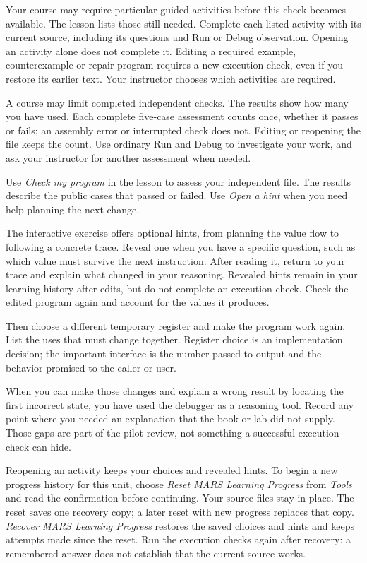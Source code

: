 Your course may require particular guided activities before this check becomes
available. The lesson lists those still needed. Complete each listed activity
with its current source, including its questions and Run or Debug observation.
Opening an activity alone does not complete it. Editing a required example,
counterexample or repair program requires a new execution check, even if you
restore its earlier text. Your instructor chooses which activities are required.

A course may limit completed independent checks. The results show how many you
have used. Each complete five-case assessment counts once, whether it passes or
fails; an assembly error or interrupted check does not. Editing or reopening the
file keeps the count. Use ordinary Run and Debug to investigate your work, and ask
your instructor for another assessment when needed.

Use \emph{Check my program} in the lesson to assess your independent file. The
results describe the public cases that passed or failed. Use \emph{Open a hint}
when you need help planning the next change.

The interactive exercise offers optional hints, from planning the value flow to
following a concrete trace. Reveal one when you have a specific question, such as
which value must survive the next instruction. After reading it, return to your
trace and explain what changed in your reasoning. Revealed hints remain in your
learning history after edits, but do not complete an execution check. Check the
edited program again and account for the values it produces.

Then choose a different temporary register and make the program work again. List
the uses that must change together. Register choice is an implementation decision;
the important interface is the number passed to output and the behavior promised
to the caller or user.

When you can make those changes and explain a wrong result by locating the first
incorrect state, you have used the debugger as a reasoning tool. Record any point
where you needed an explanation that the book or lab did not supply. Those gaps
are part of the pilot review, not something a successful execution check can hide.

Reopening an activity keeps your choices and revealed hints. To begin a new
progress history for this unit, choose \emph{Reset MARS Learning Progress} from
\emph{Tools} and read the confirmation before continuing. Your source files stay
in place. The reset saves one recovery copy; a later reset with new progress
replaces that copy. \emph{Recover MARS Learning Progress} restores the saved
choices and hints and keeps attempts made since the reset. Run the execution
checks again after recovery: a remembered answer does not establish that the
current source works.
